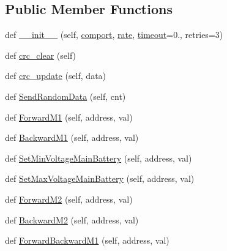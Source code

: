 \subsection*{Public Member Functions}
\begin{DoxyCompactItemize}
\item 
def \mbox{\hyperlink{classtoxic__hardware_1_1roboclaw__3_1_1Roboclaw_ad5239ef3a4454827740060ab5c1e0c9c}{\+\_\+\+\_\+init\+\_\+\+\_\+}} (self, \mbox{\hyperlink{classtoxic__hardware_1_1roboclaw__3_1_1Roboclaw_afe709148cc406a6e0792a3acd68de50e}{comport}}, \mbox{\hyperlink{classtoxic__hardware_1_1roboclaw__3_1_1Roboclaw_a823cdc6a792969a1c38973ef9b5fc1b4}{rate}}, \mbox{\hyperlink{classtoxic__hardware_1_1roboclaw__3_1_1Roboclaw_a67cef4a084cee785a5dd2c81e51acb70}{timeout}}=0., retries=3)
\item 
def \mbox{\hyperlink{classtoxic__hardware_1_1roboclaw__3_1_1Roboclaw_a01d4e39c86c2bde8ad9cd6ef89b6b8dd}{crc\+\_\+clear}} (self)
\item 
def \mbox{\hyperlink{classtoxic__hardware_1_1roboclaw__3_1_1Roboclaw_a86c78fbd3a90e9a3438d78564f3190ab}{crc\+\_\+update}} (self, data)
\item 
def \mbox{\hyperlink{classtoxic__hardware_1_1roboclaw__3_1_1Roboclaw_a3bad8c87d9c83b7edb784b5c668bda8d}{Send\+Random\+Data}} (self, cnt)
\item 
def \mbox{\hyperlink{classtoxic__hardware_1_1roboclaw__3_1_1Roboclaw_ae4af4af7532d8a6573e92515ffcf92da}{Forward\+M1}} (self, address, val)
\item 
def \mbox{\hyperlink{classtoxic__hardware_1_1roboclaw__3_1_1Roboclaw_a735777bc9e6358f2538b3140d999cab4}{Backward\+M1}} (self, address, val)
\item 
def \mbox{\hyperlink{classtoxic__hardware_1_1roboclaw__3_1_1Roboclaw_a0e841f4d237fab70600d34fffd70055c}{Set\+Min\+Voltage\+Main\+Battery}} (self, address, val)
\item 
def \mbox{\hyperlink{classtoxic__hardware_1_1roboclaw__3_1_1Roboclaw_ae94d8b42df3fa9e046cb03ee1cb1d11e}{Set\+Max\+Voltage\+Main\+Battery}} (self, address, val)
\item 
def \mbox{\hyperlink{classtoxic__hardware_1_1roboclaw__3_1_1Roboclaw_ac8ab255e7c48b4f1ac11d6822a61eb39}{Forward\+M2}} (self, address, val)
\item 
def \mbox{\hyperlink{classtoxic__hardware_1_1roboclaw__3_1_1Roboclaw_a5d222e7bbad5ec6ec17c2fddd036bad7}{Backward\+M2}} (self, address, val)
\item 
def \mbox{\hyperlink{classtoxic__hardware_1_1roboclaw__3_1_1Roboclaw_a310b31d26af0cb05464522cf153a08cc}{Forward\+Backward\+M1}} (self, address, val)

\end{DoxyCompactItemize}
